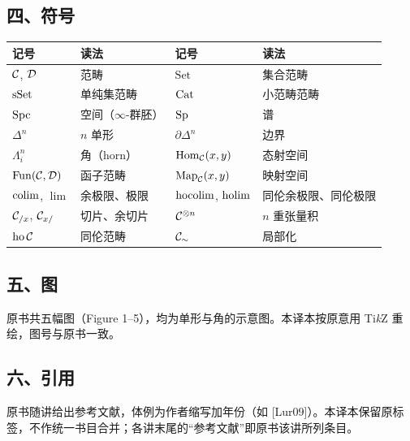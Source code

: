 \subsection*{四、符号}
\begin{center}
\small
\begin{tabular}{llll}
\toprule
记号 & 读法 & 记号 & 读法\\
\midrule
$\mathcal{C}$, $\mathcal{D}$ & 范畴 & $\mathrm{Set}$ & 集合范畴\\
$\operatorname{sSet}$ & 单纯集范畴 & $\operatorname{Cat}$ & 小范畴范畴\\
$\operatorname{Spc}$ & 空间（$\infty$-群胚） & $\operatorname{Sp}$ & 谱\\
$\Delta^n$ & $n$ 单形 & $\partial\Delta^n$ & 边界\\
$\Lambda^n_i$ & 角（horn） & $\operatorname{Hom}_{\mathcal{C}}(x,y)$ & 态射空间\\
$\operatorname{Fun}(\mathcal{C},\mathcal{D})$ & 函子范畴 & $\operatorname{Map}_{\mathcal{C}}(x,y)$ & 映射空间\\
$\operatorname{colim}$, $\lim$ & 余极限、极限 & $\operatorname{hocolim}$, $\operatorname{holim}$ & 同伦余极限、同伦极限\\
$\mathcal{C}_{/x}$, $\mathcal{C}_{x/}$ & 切片、余切片 & $\mathcal{C}^{\otimes n}$ & $n$ 重张量积\\
$\operatorname{ho}\mathcal{C}$ & 同伦范畴 & $\mathcal{C}_{\sim}$ & 局部化\\
\bottomrule
\end{tabular}
\end{center}

\subsection*{五、图}
原书共五幅图（Figure 1–5），均为单形与角的示意图。本译本按原意用 Ti\emph{k}Z 重绘，图号与原书一致。

\subsection*{六、引用}
原书随讲给出参考文献，体例为作者缩写加年份（如 [Lur09]）。本译本保留原标签，不作统一书目合并；各讲末尾的“参考文献”即原书该讲所列条目。
